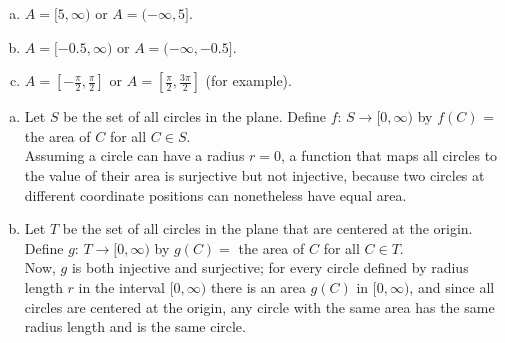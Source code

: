 \documentclass[12pt]{scrartcl} %
\begin{document}
\begin{enumerate}[(a)]
\item $A = [5, \infty)$ or $A = (-\infty, 5]$.
\item $A = [-0.5, \infty)$ or $A = (-\infty, -0.5]$.
\item $A = [-\frac{\pi}{2}, \frac{\pi}{2}]$ or $A = [\frac{\pi}{2}, \frac{3\pi}{2}]$ (for example).
\end{enumerate}

\begin{enumerate}[(a)]
\item Let $S$ be the set of all circles in the plane. Define $f: \, S \rightarrow [0, \infty)$ by $f(C)$ = the area of $C$ for all $C \in S$. \\
Assuming a circle can have a radius $r=0$, a function that maps all circles to the value of their area is surjective but not injective, because two circles at different coordinate positions can nonetheless have equal area.
\item Let $T$ be the set of all circles in the plane that are centered at the origin. Define $g: \, T \rightarrow [0, \infty)$ by $g(C) =$ the area of $C$ for all $C \in T$. \\
Now, $g$ is both injective and surjective; for every circle defined by radius length $r$ in the interval  $[0, \infty)$ there is an area $g(C)$ in $[0, \infty)$, and since all circles are centered at the origin, any circle with the same area has the same radius length and is the same circle.
\end{enumerate}
\end{document}
